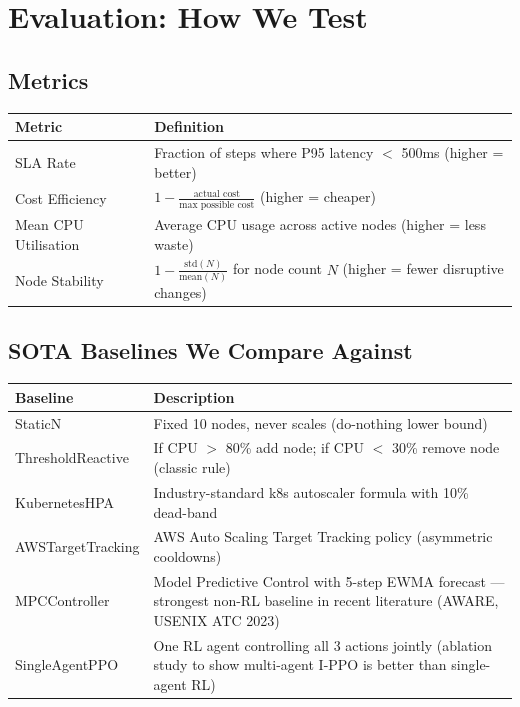 \documentclass[11pt,a4paper]{article}
\begin{document}
\section{Evaluation: How We Test}


\subsection{Metrics}

\begin{center}
\begin{tabular}{lp{9cm}}
\toprule
\textbf{Metric} & \textbf{Definition} \\
\midrule
SLA Rate & Fraction of steps where P95 latency $<$ 500ms (higher = better) \\
Cost Efficiency & $1 - \frac{\text{actual cost}}{\text{max possible cost}}$ (higher = cheaper) \\
Mean CPU Utilisation & Average CPU usage across active nodes (higher = less waste) \\
Node Stability & $1 - \frac{\text{std}(N)}{\text{mean}(N)}$ for node count $N$
                  (higher = fewer disruptive changes) \\
\bottomrule
\end{tabular}
\end{center}

\subsection{SOTA Baselines We Compare Against}

\begin{center}
\begin{tabular}{lp{8.5cm}}
\toprule
\textbf{Baseline} & \textbf{Description} \\
\midrule
StaticN & Fixed 10 nodes, never scales (do-nothing lower bound) \\
ThresholdReactive & If CPU $>$ 80\% add node; if CPU $<$ 30\% remove node (classic rule) \\
KubernetesHPA & Industry-standard k8s autoscaler formula with 10\% dead-band \\
AWSTargetTracking & AWS Auto Scaling Target Tracking policy (asymmetric cooldowns) \\
MPCController & Model Predictive Control with 5-step EWMA forecast --- strongest
                non-RL baseline in recent literature (AWARE, USENIX ATC 2023) \\
SingleAgentPPO & One RL agent controlling all 3 actions jointly (ablation study
                 to show multi-agent I-PPO is better than single-agent RL) \\
\bottomrule
\end{tabular}
\end{center}
\end{document}

